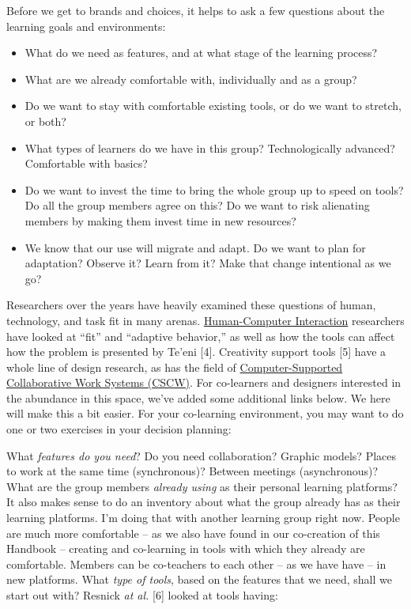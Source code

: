 Before we get to brands and choices, it helps to ask a few questions
about the learning goals and environments:

\begin{itemize}
\item
  What do we need as features, and at what stage of the learning
  process?
\item
  What are we already comfortable with, individually and as a group?
\item
  Do we want to stay with comfortable existing tools, or do we want to
  stretch, or both?
\item
  What types of learners do we have in this group? Technologically
  advanced? Comfortable with basics?
\item
  Do we want to invest the time to bring the whole group up to speed on
  tools? Do all the group members agree on this? Do we want to risk
  alienating members by making them invest time in new resources?
\item
  We know that our use will migrate and adapt. Do we want to plan for
  adaptation? Observe it? Learn from it? Make that change intentional as
  we go?
\end{itemize}
Researchers over the years have heavily examined these questions of
human, technology, and task fit in many arenas.
\href{http://en.wikipedia.org/wiki/Human-Computer\_Interaction}{Human-Computer
Interaction} researchers have looked at ``fit'' and ``adaptive
behavior,'' as well as how the tools can affect how the problem is
presented by Te'eni {[}4{]}. Creativity support tools {[}5{]} have a
whole line of design research, as has the field of
\href{http://en.wikipedia.org/wiki/Computer-supported\_cooperative\_work}{Computer-Supported
Collaborative Work Systems (CSCW)}. For co-learners and designers
interested in the abundance in this space, we've added some additional
links below. We here will make this a bit easier. For your co-learning
environment, you may want to do one or two exercises in your decision
planning:

What \emph{features do you need}? Do you need collaboration? Graphic
models? Places to work at the same time (synchronous)? Between meetings
(asynchronous)? What are the group members \emph{already using} as their
personal learning platforms? It also makes sense to do an inventory
about what the group already has as their learning platforms. I'm doing
that with another learning group right now. People are much more
comfortable -- as we also have found in our co-creation of this Handbook
-- creating and co-learning in tools with which they already are
comfortable. Members can be co-teachers to each other -- as we have have
-- in new platforms. What \emph{type of tools}, based on the features
that we need, shall we start out with? Resnick \emph{at al.} {[}6{]}
looked at tools having:

